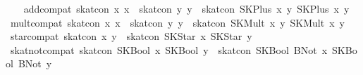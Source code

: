 \begin{isabellebody}
\isanewline
\ \ \isanewline
{}\ add{}compat{}\ {}skat{}con\ x{}\ x{}\ {}\ skat{}con\ y{}\ y{}\ {}\ skat{}con\ {}SKPlus\ x{}\ y{}{}\ {}SKPlus\ x{}\ y{}{}{}\isanewline
{}\ mult{}compat{}\ {}skat{}con\ x{}\ x{}\ {}\ skat{}con\ y{}\ y{}\ {}\ skat{}con\ {}SKMult\ x{}\ y{}{}\ {}SKMult\ x{}\ y{}{}{}\isanewline
{}\ star{}compat{}\ {}skat{}con\ x\ y\ {}\ skat{}con\ {}SKStar\ x{}\ {}SKStar\ y{}{}\isanewline
{}\ skat{}not{}compat{}\ {}skat{}con\ {}SKBool\ x{}\ {}SKBool\ y{}\ {}\ skat{}con\ {}SKBool\ {}BNot\ x{}{}\ {}SKBool\ {}BNot\ y{}{}{}\isanewline

\end{isabellebody}
